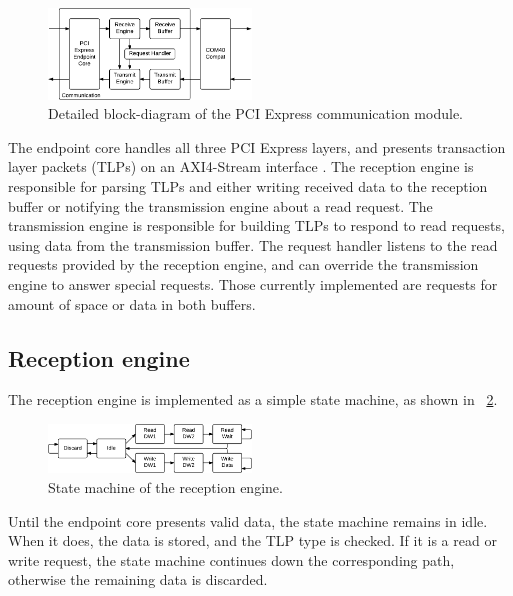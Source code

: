 \begin{figure}[!ht]
    \centering
    \includegraphics[width=0.48\textwidth]{figures/details-communication}
    \caption{Detailed block-diagram of the PCI Express communication module.}
    \label{fig:details-communication}
\end{figure}

The endpoint core handles all three PCI Express layers, and presents transaction layer packets (TLPs) on an AXI4-Stream interface \cite{ug672}.
The reception engine is responsible for parsing TLPs and either writing received data to the reception buffer or notifying the transmission engine about a read request.
The transmission engine is responsible for building TLPs to respond to read requests, using data from the transmission buffer.
The request handler listens to the read requests provided by the reception engine, and can override the transmission engine to answer special requests.
Those currently implemented are requests for amount of space or data in both buffers.

\subsection{Reception engine}

The reception engine is implemented as a simple state machine, as shown in \figurename~\ref{fig:statemachine-receive}.

\begin{figure}[!ht]
    \centering
    \includegraphics[width=0.48\textwidth]{figures/statemachine-receive}
    \caption{State machine of the reception engine.}
    \label{fig:statemachine-receive}
\end{figure}

Until the endpoint core presents valid data, the state machine remains in idle.
When it does, the data is stored, and the TLP type is checked.
If it is a read or write request, the state machine continues down the corresponding path, otherwise the remaining data is discarded.

